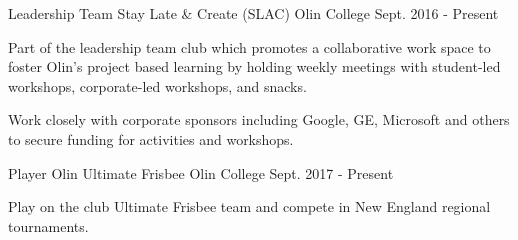 

\begin{cventries}

  \cventry
    {Leadership Team} %
    {Stay Late \& Create (SLAC)} %
    {Olin College} %
    {Sept. 2016 - Present} %
    {
      \begin{cvitems} %
        \item Part of the leadership team club which promotes a collaborative work space to foster Olin's project based learning by holding weekly meetings with student-led workshops, corporate-led workshops, and snacks. 
        \item Work closely with corporate sponsors including Google, GE, Microsoft and others to secure funding for activities and workshops.
      \end{cvitems}
    }
\cventry
    {Player} %
    {Olin Ultimate Frisbee} %
    {Olin College} %
    {Sept. 2017 - Present} %
    {
      \begin{cvitems} %
        \item {Play on the club Ultimate Frisbee team and compete in New England regional tournaments.}
      \end{cvitems}
    }

\end{cventries}
